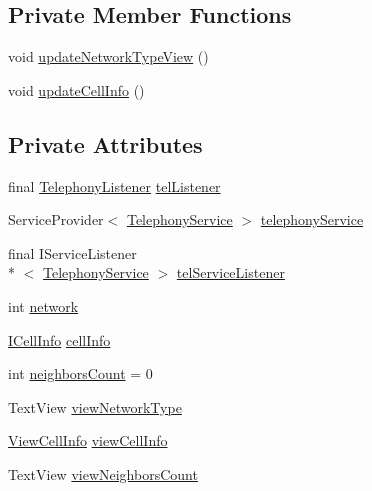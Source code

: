 \subsection*{Private Member Functions}
\begin{DoxyCompactItemize}
\item 
void \hyperlink{classcom_1_1qualoutdoor_1_1recorder_1_1home_1_1NetworkFragment_a903fb8aa5cc3e80f765d1a0a237168b2}{update\-Network\-Type\-View} ()
\item 
void \hyperlink{classcom_1_1qualoutdoor_1_1recorder_1_1home_1_1NetworkFragment_ac3d1f4da7e20d224cb3f3e6a5c9baac4}{update\-Cell\-Info} ()
\end{DoxyCompactItemize}
\subsection*{Private Attributes}
\begin{DoxyCompactItemize}
\item 
final \hyperlink{classcom_1_1qualoutdoor_1_1recorder_1_1telephony_1_1TelephonyListener}{Telephony\-Listener} \hyperlink{classcom_1_1qualoutdoor_1_1recorder_1_1home_1_1NetworkFragment_ad5a2cd1711f52e14b57a04baa87c3ef4}{tel\-Listener}
\item 
Service\-Provider$<$ \hyperlink{classcom_1_1qualoutdoor_1_1recorder_1_1telephony_1_1TelephonyService}{Telephony\-Service} $>$ \hyperlink{classcom_1_1qualoutdoor_1_1recorder_1_1home_1_1NetworkFragment_a35dd597a3f347ab93d8e9df9a59e7fc3}{telephony\-Service}
\item 
final I\-Service\-Listener\\*
$<$ \hyperlink{classcom_1_1qualoutdoor_1_1recorder_1_1telephony_1_1TelephonyService}{Telephony\-Service} $>$ \hyperlink{classcom_1_1qualoutdoor_1_1recorder_1_1home_1_1NetworkFragment_ae919499ecf136f3ed40b74f96ffbd206}{tel\-Service\-Listener}
\item 
int \hyperlink{classcom_1_1qualoutdoor_1_1recorder_1_1home_1_1NetworkFragment_a77658d6cfaaf2f11c93f8b018b3ccacf}{network}
\item 
\hyperlink{interfacecom_1_1qualoutdoor_1_1recorder_1_1telephony_1_1ICellInfo}{I\-Cell\-Info} \hyperlink{classcom_1_1qualoutdoor_1_1recorder_1_1home_1_1NetworkFragment_a5987f3378b351e0c9e9b8520074a7e2d}{cell\-Info}
\item 
int \hyperlink{classcom_1_1qualoutdoor_1_1recorder_1_1home_1_1NetworkFragment_a98e0d9ad80321ac12baeacb95f7d6cd7}{neighbors\-Count} = 0
\item 
Text\-View \hyperlink{classcom_1_1qualoutdoor_1_1recorder_1_1home_1_1NetworkFragment_a173f53c15b13d08ff7336cfa79c2fedf}{view\-Network\-Type}
\item 
\hyperlink{classcom_1_1qualoutdoor_1_1recorder_1_1telephony_1_1ViewCellInfo}{View\-Cell\-Info} \hyperlink{classcom_1_1qualoutdoor_1_1recorder_1_1home_1_1NetworkFragment_a735fedd7e51ddea51f2d2461eb324763}{view\-Cell\-Info}
\item 
Text\-View \hyperlink{classcom_1_1qualoutdoor_1_1recorder_1_1home_1_1NetworkFragment_a7b0e6b40540b22cd96bc55bb0f92863c}{view\-Neighbors\-Count}
\end{DoxyCompactItemize}
